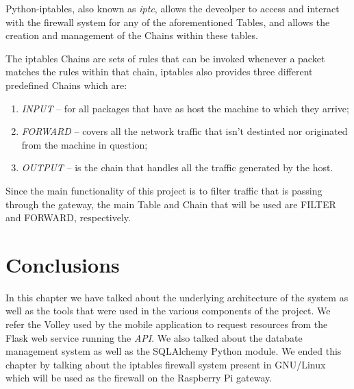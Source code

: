 Python-iptables, also known as \emph{iptc}, allows the deveolper to access and
interact with the firewall system for any of the aforementioned Tables, and
allows the creation and management of the Chains within these tables.

The iptables Chains are sets of rules that can be invoked whenever a packet
matches the rules within that chain, iptables also provides three different
predefined Chains which are:
\begin{enumerate}
	\item \emph{INPUT} -- for all packages that have as host the machine to
		which they arrive;
	\item \emph{FORWARD} -- covers all the network traffic that isn't destinted
		nor originated from the machine in question;
	\item \emph{OUTPUT} -- is the chain that handles all the traffic generated
		by the host.
\end{enumerate}

Since the main functionality of this project is to filter traffic that is
passing through the gateway, the main Table and Chain that will be used are
FILTER and FORWARD, respectively.

\section{Conclusions}
\label{chap3:sec:concs}
In this chapter we have talked about the underlying architecture of the system
as well as the tools that were used in the various components of the project.
We refer the Volley used by the mobile application to request resources from the
Flask web service running the \emph{\ac{API}}. We also talked about the databate
management system as well as the SQLAlchemy Python module. We ended this chapter
by talking about the iptables firewall system present in GNU/Linux which will be
used as the firewall on the Raspberry Pi gateway.
